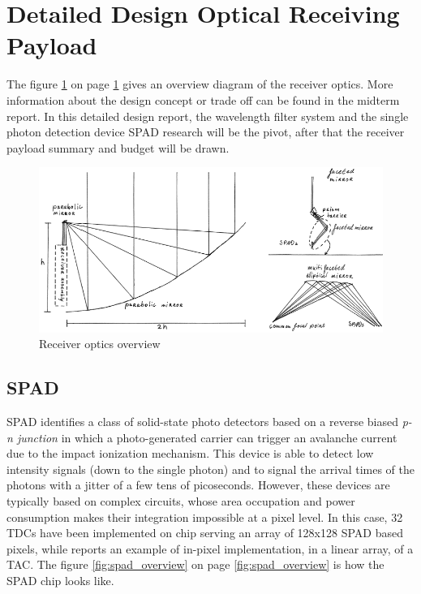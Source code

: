 \section{Detailed Design Optical Receiving Payload}
\label{sec:DDreceiver}
The figure \ref{fig:receiver_overview} on page \ref{fig:receiver_overview} gives an overview diagram of the receiver optics.  More information about the design concept or trade off can be found in the midterm report. In this detailed design report, the wavelength filter system and the single photon detection device \acs{SPAD} research will be the pivot, after that the receiver payload summary and budget will be drawn.

\begin{figure}[ht!]
\centering
\includegraphics[scale = 0.5]{chapters/img/DiagramReceiverGeneral.png}
\caption{Receiver optics overview}
\label{fig:receiver_overview}
\end{figure} 

\subsection{\ac{SPAD}}
\label{SPAD}
\ac{SPAD} identifies a class of solid-state photo detectors based on a reverse biased \textit{p-n junction} in which a photo-generated carrier can trigger an avalanche current due to the impact ionization mechanism. This device is able to detect low intensity signals (down to the single photon) and to signal the arrival times of the photons with a jitter of a few tens of picoseconds. However, these devices are typically based on complex circuits, whose area occupation and power consumption makes their integration impossible at a pixel level. In this case, 32 \ac{TDC}s have been implemented on chip serving an array of 128x128 SPAD based pixels, while reports an example of in-pixel implementation, in a linear array, of a \ac{TAC}\cite{SPAD3}. The figure \ref{fig:spad_overview} on page \ref{fig:spad_overview} is how the \acs{SPAD} chip looks like.

